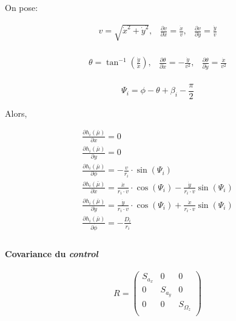 \documentclass[a4paper]{paper}
\begin{document}
On pose:

\[ \begin{array}{ccc}
    v = \sqrt{\dot{x}^2 + \dot{y}^2}, &
    \frac{\partial v}{\partial \dot{x}} = \frac{\dot{x}}{v}, &
    \frac{\partial v}{\partial \dot{y}} = \frac{\dot{y}}{v} \\
\end{array} \]

\[ \begin{array}{ccc}
    \theta = \tan^{-1}\left( \frac{\dot{y}}{\dot{x}} \right), &
    \frac{\partial \theta}{\partial \dot{x}} = - \frac{\dot{y}}{v^2}, &
    \frac{\partial \theta}{\partial \dot{y}} = \frac{\dot{x}}{v^2} \\
\end{array} \]

\[ \Psi_i = \phi - \theta + \beta_i - \frac{\pi}{2} \]

Alors,

\begin{equation}
    \begin{array}{l}
        \frac{\partial h_i\left(\bar{\mu}\right)}{\partial x} = 0 \\
        \frac{\partial h_i\left(\bar{\mu}\right)}{\partial y} = 0 \\
        \frac{\partial h_i\left(\bar{\mu}\right)}{\partial \phi} = - \frac{v}{r_i} \cdot \sin \left( \Psi_i \right) \\
        \frac{\partial h_i\left(\bar{\mu}\right)}{\partial \dot{x}} = \frac{\dot{x}}{r_i \cdot v} \cdot \cos \left( \Psi_i \right)
            - \frac{\dot{y}}{r_i \cdot v} \sin \left( \Psi_i \right) \\
        \frac{\partial h_i\left(\bar{\mu}\right)}{\partial \dot{y}} = \frac{\dot{y}}{r_i \cdot v} \cdot \cos \left( \Psi_i \right)
            + \frac{\dot{x}}{r_i \cdot v} \sin \left( \Psi_i \right)\\
        \frac{\partial h_i\left(\bar{\mu}\right)}{\partial \dot{\phi}} = - \frac{D_i}{r_i}\\
    \end{array}
\end{equation}

\paragraph{Covariance du \emph{control}}
\begin{equation}
    R =
    \left( \begin{array}{ccc}
        S_{a_x} & 0 & 0 \\
        0 & S_{a_y} & 0 \\
        0 & 0 & S_{\Omega_z} \\
    \end{array} \right)
\end{equation}
\end{document}
